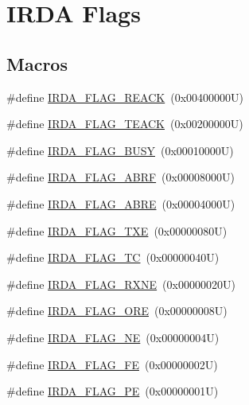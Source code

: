 \hypertarget{group___i_r_d_a___flags}{}\section{I\+R\+DA Flags}
\label{group___i_r_d_a___flags}
\subsection*{Macros}
\begin{DoxyCompactItemize}
\item 
\#define \hyperlink{group___i_r_d_a___flags_ga331e42c59ed0ce052f1f75cdc3282eb3}{I\+R\+D\+A\+\_\+\+F\+L\+A\+G\+\_\+\+R\+E\+A\+CK}~(0x00400000\+U)
\item 
\#define \hyperlink{group___i_r_d_a___flags_gad85e4b7a95ba759e92680611750f5ed1}{I\+R\+D\+A\+\_\+\+F\+L\+A\+G\+\_\+\+T\+E\+A\+CK}~(0x00200000\+U)
\item 
\#define \hyperlink{group___i_r_d_a___flags_ga6353f0b1e0bd52c3ac114feaa0ca0cdd}{I\+R\+D\+A\+\_\+\+F\+L\+A\+G\+\_\+\+B\+U\+SY}~(0x00010000\+U)
\item 
\#define \hyperlink{group___i_r_d_a___flags_ga7e45c6d6604fcb3d4fbe8aa8fb7ee5c7}{I\+R\+D\+A\+\_\+\+F\+L\+A\+G\+\_\+\+A\+B\+RF}~(0x00008000\+U)
\item 
\#define \hyperlink{group___i_r_d_a___flags_ga69409b95feb7c332d3261778a1d267f6}{I\+R\+D\+A\+\_\+\+F\+L\+A\+G\+\_\+\+A\+B\+RE}~(0x00004000\+U)
\item 
\#define \hyperlink{group___i_r_d_a___flags_ga88d22267566352225a9ec253d3976b0f}{I\+R\+D\+A\+\_\+\+F\+L\+A\+G\+\_\+\+T\+XE}~(0x00000080\+U)
\item 
\#define \hyperlink{group___i_r_d_a___flags_gaea9a2c5c33c5fb8e0109801ba005712a}{I\+R\+D\+A\+\_\+\+F\+L\+A\+G\+\_\+\+TC}~(0x00000040\+U)
\item 
\#define \hyperlink{group___i_r_d_a___flags_ga044e8008f094da17c9c7371832079a73}{I\+R\+D\+A\+\_\+\+F\+L\+A\+G\+\_\+\+R\+X\+NE}~(0x00000020\+U)
\item 
\#define \hyperlink{group___i_r_d_a___flags_gadd2f51365f80ae4ce344ba9eb6ab7b81}{I\+R\+D\+A\+\_\+\+F\+L\+A\+G\+\_\+\+O\+RE}~(0x00000008\+U)
\item 
\#define \hyperlink{group___i_r_d_a___flags_ga01d432c277dde71d06e3452881affadd}{I\+R\+D\+A\+\_\+\+F\+L\+A\+G\+\_\+\+NE}~(0x00000004\+U)
\item 
\#define \hyperlink{group___i_r_d_a___flags_ga9cfd704788e477a3af6a5df18c957962}{I\+R\+D\+A\+\_\+\+F\+L\+A\+G\+\_\+\+FE}~(0x00000002\+U)
\item 
\#define \hyperlink{group___i_r_d_a___flags_ga54e075e6ed11a2b9bd7776ebd049211b}{I\+R\+D\+A\+\_\+\+F\+L\+A\+G\+\_\+\+PE}~(0x00000001\+U)
\end{DoxyCompactItemize}


